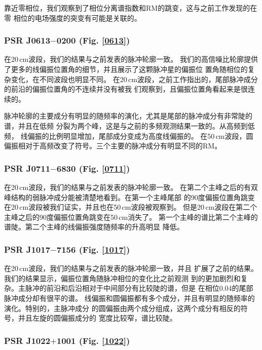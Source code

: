 靠近零相位，我们观察到了相位分离谱指数和RM的跳变，这与之前工作发现的在零
相位的电场强度的突变有可能是关联的\supercite{Oslowski14}。

\subsubsection{PSR J0613$-$0200 (Fig. \ref{0613})}

在20\,cm波段，我们的结果与之前发表的脉冲轮廓一致\supercite{Ord04,Yan11a}。
我们的高信噪比轮廓提供了更多的线偏振位置角的细节，并且展示了这颗脉冲星的偏振位
置角随相位的复杂变化，在不同波段也明显不同。
%
在20\,cm波段，之前工作指出的，尾部脉冲成分的前沿的偏振位置角的不连续并没有被我
们观察到\supercite{Yan11a}，且偏振位置角看起来是很连续的。

脉冲轮廓的主要成分有明显的随频率的演化，尤其是尾部的脉冲成分有非常陡的谱，并且在低频
分裂为两个峰，这是与之前的多频观测结果一致的\supercite{Stairs99}。从高频到低频，
线偏振的比例明显增加，尾部成分变成为高度线偏振的。
%
在50\,cm波段，圆偏振相对于高频改变了符号。三个主要的脉冲成分有明显不同的RM。


\subsubsection{PSR J0711$-$6830 (Fig. \ref{0711})}

在20\,cm波段，我们的结果与之前发表的脉冲轮廓一致\supercite{Ord04,Yan11a}。
在第二个主峰之后的有双峰结构的弱脉冲成分能被清楚地看到。在第一个主峰尾部
的90度偏振位置角跳变在20\,cm波段被我们证实，并且也在50\,cm波段被观察到。
但是20\,cm波段在第二个主峰之后的90度偏振位置角跳变在50\,cm消失了。
%
第一个主峰的谱比第二个主峰的谱陡。第二个主峰的线偏振强度随频率的升高明显
降低。

\subsubsection{PSR J1017$-$7156 (Fig. \ref{1017})}

在20\,cm波段，我们的结果与之前发表的脉冲轮廓一致\supercite{Keith12}，并且
扩展了之前的结果。我们的结果显示，偏振位置角随脉冲相位的变化比之前观测
到的更加剧烈和复杂。主脉冲的前沿和后沿相对于中间部分有比较陡的谱，但是
在相位0.04的尾部脉冲成分却有很平的谱。
%
线偏振和圆偏振都有多个成分，并且有明显的随频率的演化。特别的，主脉冲成分
的圆偏振由两个成分组成，这两个成分有相反的符号，并且左旋的圆偏振成分的
宽度比较窄，谱比较陡。

\subsubsection{PSR J1022$+$1001 (Fig. \ref{1022})}

